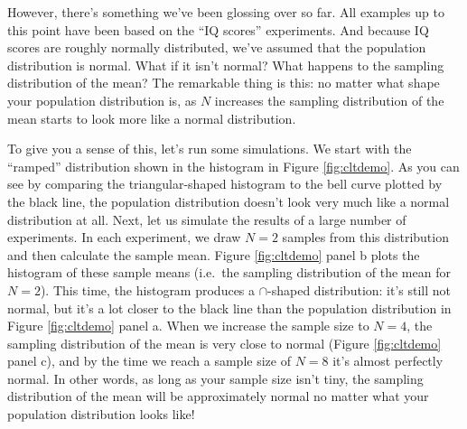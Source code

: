 \documentclass[
  11pt,
  a4paper,
  twoside,symmetric,openright]{book}
\theoremstyle{break}
\theoremstyle{break}
\begin{document}
However, there's something we've been glossing over so far. All examples up to this point have been based on the ``IQ scores'' experiments. And because IQ scores are roughly normally distributed, we've assumed that the population distribution is normal. What if it isn't normal? What happens to the sampling distribution of the mean? The remarkable thing is this: no matter what shape your population distribution is, as \(N\) increases the sampling distribution of the mean starts to look more like a normal distribution.

To give you a sense of this, let's run some simulations. We start with the ``ramped'' distribution shown in the histogram in Figure \ref{fig:cltdemo}. As you can see by comparing the triangular-shaped histogram to the bell curve plotted by the black line, the population distribution doesn't look very much like a normal distribution at all. Next, let us simulate the results of a large number of experiments. In each experiment, we draw \(N=2\) samples from this distribution and then calculate the sample mean. Figure \ref{fig:cltdemo} panel b plots the histogram of these sample means (i.e.~the sampling distribution of the mean for \(N=2\)). This time, the histogram produces a \(\cap\)-shaped distribution: it's still not normal, but it's a lot closer to the black line than the population distribution in Figure \ref{fig:cltdemo} panel a. When we increase the sample size to \(N=4\), the sampling distribution of the mean is very close to normal (Figure \ref{fig:cltdemo} panel c), and by the time we reach a sample size of \(N=8\) it's almost perfectly normal. In other words, as long as your sample size isn't tiny, the sampling distribution of the mean will be approximately normal no matter what your population distribution looks like!
\end{document}

